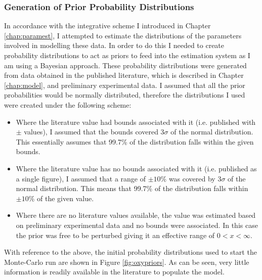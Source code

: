 \subsubsection{Generation of Prior Probability Distributions}
In accordance with the integrative scheme I introduced in Chapter \ref{chap:paramest}, I attempted to estimate the distributions of the parameters involved in modelling these data. In order to do this I needed to create probability distributions to act as priors to feed into the estimation system as I am using a Bayesian approach. These probability distributions were generated from data obtained in the published literature, which is described in Chapter \ref{chap:model}, and preliminary experimental data. I assumed that all the prior probabilities would be normally distributed, therefore the distributions I used were created under the following scheme:
\begin{itemize}
	\item Where the literature value had bounds associated with it (i.e. published with $\pm{}$ values), I assumed that the bounds covered $3 \sigma$ of the normal distribution. This essentially assumes that 99.7\% of the distribution falls within the given bounds.
	\item Where the literature value has no bounds associated with it (i.e. published as a single figure), I assumed that a range of $\pm 10\%$ was covered by $3 \sigma$ of the normal distribution. This means that 99.7\% of the distribution falls within $\pm 10\%$ of the given value.
	\item Where there are no literature values available, the value was estimated based on preliminary experimental data and no bounds were associated. In this case the prior was free to be perturbed giving it an effective range of $0 < x < \infty$.
\end{itemize}
With reference to the above, the initial probability distributions used to start the Monte-Carlo run are shown in Figure \ref{fig:oxypriors}. As can be seen, very little information is readily available in the literature to populate the model.

